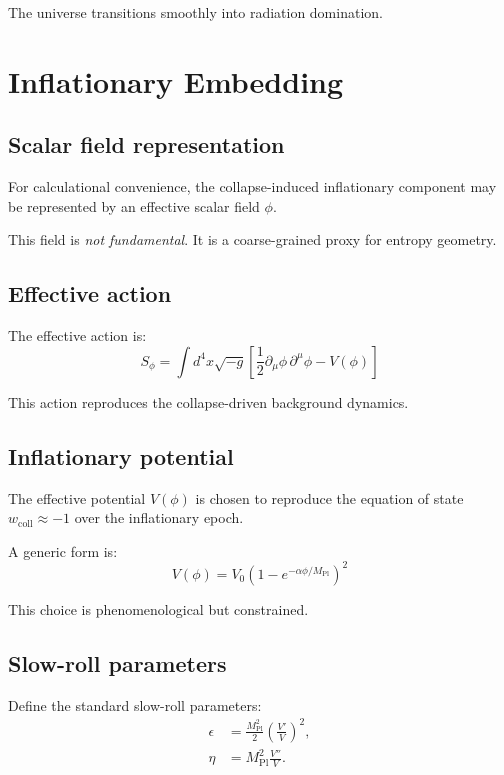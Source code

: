 \documentclass[11pt]{book}
\newcommand{\mpl}{M_{\mathrm{Pl}}}
\begin{document}
The universe transitions smoothly into radiation domination.

\chapter{Inflationary Embedding}

\section{Scalar field representation}

For calculational convenience, the collapse-induced inflationary
component may be represented by an effective scalar field $\phi$.

This field is \emph{not fundamental}.
It is a coarse-grained proxy for entropy geometry.

\section{Effective action}

The effective action is:
\begin{equation}
S_\phi =
\int d^4x\sqrt{-g}
\left[
\frac{1}{2}\partial_\mu \phi\,\partial^\mu \phi
- V(\phi)
\right]
\end{equation}

This action reproduces the collapse-driven background dynamics.

\section{Inflationary potential}

The effective potential $V(\phi)$ is chosen to reproduce the equation
of state $w_{\mathrm{coll}} \approx -1$ over the inflationary epoch.

A generic form is:
\begin{equation}
V(\phi) = V_0\left(1 - e^{-\alpha \phi/\mpl}\right)^2
\end{equation}

This choice is phenomenological but constrained.

\section{Slow-roll parameters}

Define the standard slow-roll parameters:
\begin{align}
\epsilon &=
\frac{\mpl^2}{2}
\left(\frac{V'}{V}\right)^2, \\
\eta &=
\mpl^2 \frac{V''}{V}.
\end{align}
\end{document}
